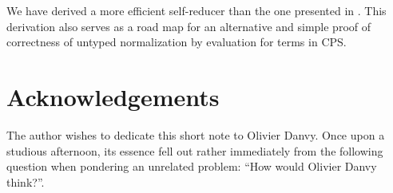 \documentclass[a4paper]{amsart}
\begin{document}
We have derived a more efficient self-reducer than the one presented in
\citep{mogensen:selfint}. This derivation also serves as a road map for an
alternative and simple proof of correctness of untyped normalization by
evaluation for terms in CPS.

\section*{Acknowledgements}

The author wishes to dedicate this short note to Olivier Danvy. Once upon a
studious afternoon, its essence fell out rather immediately from the following
question when pondering an unrelated problem: ``How would Olivier Danvy
think?''.



\end{document}
